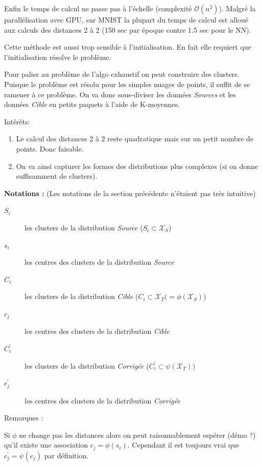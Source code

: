 Enfin le temps de calcul ne passe pas à l'échelle (complexité $\mathcal O (n^2)$).
Malgré la parallélisation avec GPU, sur MNIST la plupart du temps de calcul 
est alloué aux calculs des distances 2 à 2 (150 sec par époque contre 1.5 sec 
pour le NN).

Cette méthode est aussi trop sensible à l'initialisation. En fait elle 
requiert que l'initialisation résolve le problème.


Pour palier au problème de l'algo exhaustif on peut construire des clusters. 
Puisque le problème est résolu pour les simples nuages de points, il suffit 
de se ramener à ce problème. On va donc sous-diviser les données \emph{Sources}
et les données \emph{Cible} en petits paquets à l'aide de K-moyennes.

Intérêts:
\begin{enumerate}
	\item Le calcul des distances 2 à 2 reste quadratique mais sur un petit 
	nombre de points. Donc faisable.
	\item On va ainsi capturer les formes des distributions plus complexes (si
	on donne suffisamment de clusters).
\end{enumerate}

\textbf{Notations :} (Les notations de la section précédente n'étaient pas très intuitive)
\begin{description}
\item[$S_i$] les clusters de la distribution \emph{Source} 
	($S_i \subset \mathcal X_S$)
\item[$s_i$] les centres des clusters de la distribution \emph{Source} 
\item[$C_i$] les clusters de la distribution \emph{Cible} 
	($C_i \subset \mathcal X_T (= \phi(\mathcal X_S)$)
\item[$c_j$] les centres des clusters de la distribution \emph{Cible}  
\item[$C_i^\prime$] les clusters de la distribution \emph{Corrigée} 
	($C_i^\prime \subset \mathcal \psi(\mathcal X_T) )$ 
\item[$c_j^\prime$] les centres des clusters de la distribution \emph{Corrigée}
\end{description}

Remarques :

Si $\phi$ ne change pas les distances alors on peut raisonnablement 
espérer (démo ?) qu'il existe une association $c_j = \phi(s_i)$. Cependant il 
est toujours vrai que $c_j^\prime = \psi(c_j)$ par définition.


